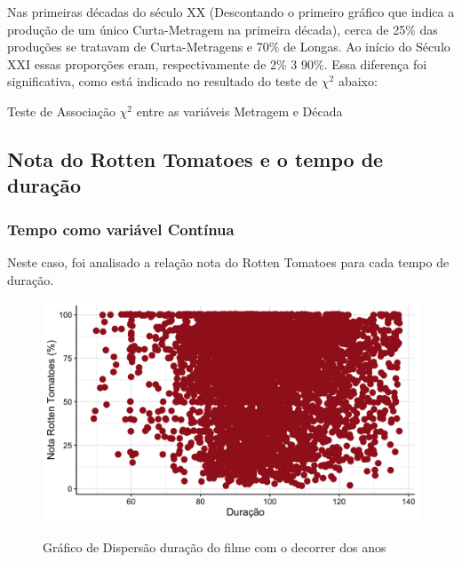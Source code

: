 \documentclass[a4paper, 12pt]{article} %
\begin{document}
Nas primeiras décadas do século XX (Descontando o primeiro gráfico que indica a produção de um único Curta-Metragem na primeira década), cerca de 25\% das produções se tratavam de Curta-Metragens e 70\% de Longas. Ao início do Século XXI essas proporções eram, respectivamente de 2\% 3 90\%. Essa diferença foi significativa, como está indicado no resultado do teste de $\chi^2$ abaixo:

\begin{quadro}[H]
\centering
\caption{Teste de Associação $\chi^2$ entre as variáveis Metragem e Década }
\label{R-Q-Teste-1}
\vspace{0.1cm}
\end{quadro}

\subsection{Nota do Rotten Tomatoes e o tempo de duração}

\subsubsection{Tempo como variável Contínua}

Neste caso, foi analisado a relação nota  do Rotten Tomatoes para cada tempo de duração. 
 
\begin{figure}[H]
    \centering
    \caption{Gráfico de Dispersão duração do filme com o decorrer dos anos}
    \includegraphics[scale=0.15]{Fig_Rotten_Duracao.png}
    \label{fig:my_label}
\end{figure}
\end{document}
